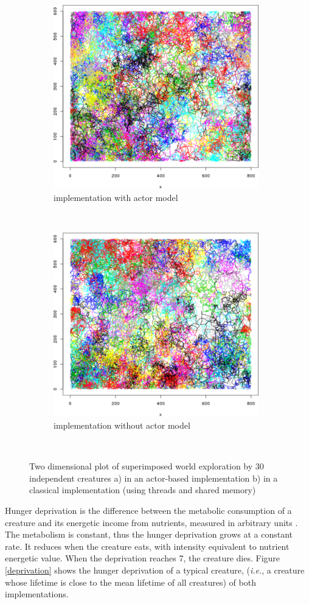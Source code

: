\documentclass[runningheads]{llncs}
\begin{document}
\begin{figure}[h]
	\centering
	\begin{subfigure}[t]{1\textwidth}
		\centering
		\includegraphics[height=8cm]{images/tracingAkka}
		\caption{implementation with actor model}
		\label{trace:akka}
	\end{subfigure}%
	\\
	\begin{subfigure}[t]{1\textwidth}
		\centering
		\includegraphics[height=8cm]{images/tracingNoAkka}
		\caption{implementation without actor model}
		\label{trace:noAkka}
	\end{subfigure}%
	~
	\caption{Two dimensional plot of superimposed world exploration by 30 independent creatures a) in an actor-based implementation b) in a classical implementation (using threads and shared memory) }
	\label{tracing}
\end{figure}


Hunger deprivation is the difference between the metabolic consumption of a creature and its energetic income from nutrients, measured in arbitrary units \cite{Campos}. The metabolism is constant, thus the hunger deprivation grows at a constant rate. It reduces when the creature eats, with intensity equivalent to nutrient energetic value. When the deprivation reaches 7, the creature dies. Figure \ref{deprivation} shows the hunger deprivation of a typical creature, (\textit{i.e.}, a creature whose lifetime is close to the mean lifetime of all creatures) of both implementations. 
\end{document}
